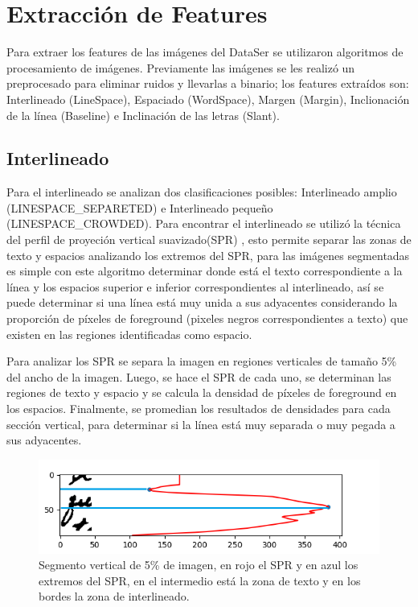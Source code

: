 \documentclass[10pt, a4paper]{article}
\begin{document}
    \section{Extracci\'on de Features}
        Para extraer los features de las im\'agenes del DataSer se utilizaron algoritmos de procesamiento de im\'agenes. Previamente las im\'agenes se les realiz\'o un 
        preprocesado para eliminar ruidos y llevarlas a binario; los features extra\'idos son: Interlineado (LineSpace), Espaciado (WordSpace), Margen (Margin), Inclionaci\'on de la l\'inea (Baseline) e Inclinaci\'on de las letras (Slant). 

        \subsection{Interlineado} 

            Para el interlineado se analizan dos clasificaciones posibles: Interlineado amplio (LINESPACE\_SEPARETED) e Interlineado peque\~no (LINESPACE\_CROWDED). Para encontrar el interlineado se utiliz\'o la t\'ecnica del perfil 
            de proyeci\'on vertical suavizado(SPR) \cite{gavrilescu2018predicting}, esto permite separar las zonas de texto y espacios analizando los extremos del SPR, para las im\'agenes segmentadas es simple con este algoritmo determinar donde est\'a el texto correspondiente a la l\'inea y los espacios superior e inferior
            correspondientes al interlineado, as\'i se puede determinar si una l\'inea est\'a muy unida a sus adyacentes considerando la proporci\'on de p\'ixeles de foreground (pixeles negros correspondientes a texto) que existen en 
            las regiones identificadas como espacio.

            Para analizar los SPR se separa la imagen en regiones verticales de tama\~no 5\% del ancho de la imagen. Luego, se hace el SPR de cada uno, se determinan las regiones de texto y espacio \cite{papavassiliou2010handwritten} y se calcula la densidad 
            de p\'ixeles de foreground en los espacios. Finalmente, se promedian los resultados de densidades para cada secci\'on vertical, para determinar si la l\'inea est\'a muy separada o muy pegada a sus adyacentes. 

            \begin{figure}[!h]
                \centering
                \includegraphics[width = 0.5\linewidth]{Figure_1.png}
                \caption{Segmento vertical de 5\% de imagen, en rojo el SPR y en azul los extremos del SPR, en el intermedio est\'a la zona de texto y en los bordes la zona de interlineado.}
            \end{figure}
\end{document}
